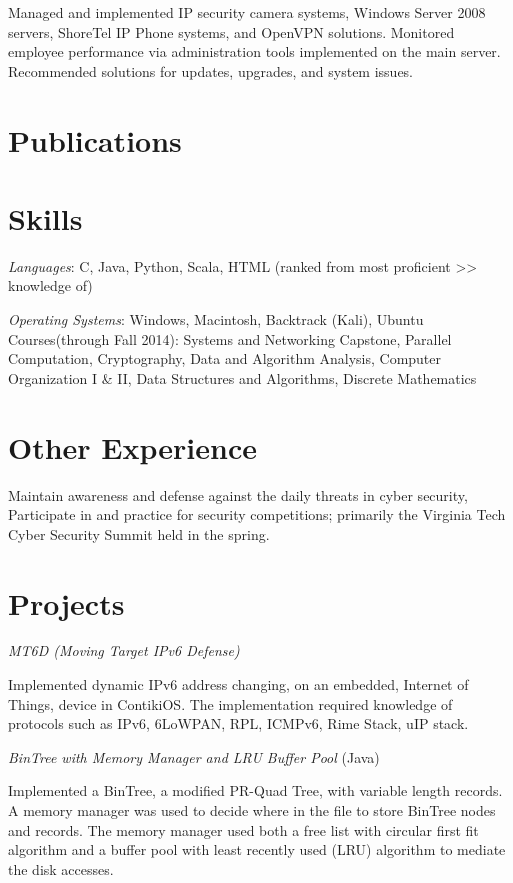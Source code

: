 \documentclass{tpreiss_cv}
\begin{document}
Managed and implemented IP security camera systems, Windows Server 2008 servers, ShoreTel IP Phone systems, and OpenVPN solutions. Monitored employee performance via administration tools implemented on    the main server. Recommended solutions for updates, upgrades, and system issues.

\section{Publications}

\section{Skills}
\textit{Languages}: C, Java, Python, Scala, HTML (ranked from most proficient >> knowledge of)

\textit{Operating Systems}: Windows, Macintosh, Backtrack (Kali), Ubuntu
Courses(through Fall 2014):    Systems and Networking Capstone, Parallel Computation, Cryptography, Data and Algorithm Analysis, Computer Organization I \& II, Data Structures and Algorithms, Discrete Mathematics

\section{Other Experience} 
Maintain awareness and defense against the daily threats in cyber security, Participate in and practice for security competitions; primarily the Virginia Tech Cyber Security Summit held in the spring.

\section{Projects}
\textit{MT6D (Moving Target IPv6 Defense)}

Implemented dynamic IPv6 address changing, on an embedded, Internet of Things, device in ContikiOS. The implementation required knowledge of protocols such as IPv6, 6LoWPAN, RPL, ICMPv6, Rime Stack, uIP stack.

\textit{BinTree with Memory Manager and LRU Buffer Pool} (Java)

Implemented a BinTree, a modified PR-Quad Tree, with variable length records. A memory manager was used to decide where in the file to store BinTree nodes and records. The memory manager used both a free list with circular first fit algorithm and a buffer pool with least recently used (LRU) algorithm to mediate the disk accesses.
\end{document}
